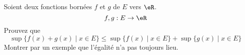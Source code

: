 
\begin{exercice}\label{exo0004}

Soient deux fonctions bornées $f$ et $g$ de $E$ vers $\eR$.
\[
f,g : E \rightarrow \eR
\]
Prouvez que
\[
\sup \{f(x)+g(x) \mid x\in E \} \leq \sup \{f(x) \mid x\in E \} + \sup \{ g(x) \mid x\in E \}
\]
Montrer par un exemple que l'égalité n'a pas toujours lieu.

\end{exercice}
